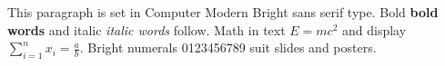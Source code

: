 \documentclass{article}
\begin{document}
This paragraph is set in Computer Modern Bright sans serif type.
Bold \textbf{bold words} and italic \textit{italic words} follow.
Math in text $E = mc^2$ and display $\sum_{i=1}^{n} x_i = \frac{a}{b}$.
Bright numerals 0123456789 suit slides and posters.
\end{document}
